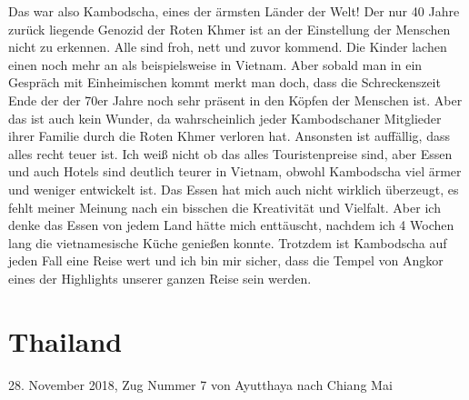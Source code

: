 \documentclass[11pt]{book}
\begin{document}
Das war also Kambodscha, eines der ärmsten Länder der Welt! Der nur 40 Jahre zurück liegende Genozid der Roten Khmer ist an der 
Einstellung der Menschen nicht zu erkennen. Alle sind froh, nett und zuvor kommend. Die Kinder lachen einen noch mehr an als 
beispielsweise in Vietnam. Aber sobald man in ein Gespräch mit Einheimischen kommt merkt man doch, dass die Schreckenszeit Ende der 
der 70er Jahre noch sehr präsent in den Köpfen der Menschen ist. Aber das ist auch kein Wunder, da wahrscheinlich jeder Kambodschaner 
Mitglieder ihrer Familie durch die Roten Khmer verloren hat. Ansonsten ist auffällig, dass alles recht teuer ist. Ich weiß nicht ob das 
alles Touristenpreise sind, aber Essen und auch Hotels sind deutlich teurer in Vietnam, obwohl Kambodscha viel ärmer und weniger 
entwickelt ist. Das Essen hat mich auch nicht wirklich überzeugt, es fehlt meiner Meinung nach ein bisschen die Kreativität und 
Vielfalt. Aber ich denke das Essen von jedem Land hätte mich enttäuscht, nachdem ich 4 Wochen lang die vietnamesische Küche genießen 
konnte. Trotzdem ist Kambodscha auf jeden Fall eine Reise wert und ich bin mir sicher, dass die Tempel von Angkor eines der Highlights 
unserer ganzen Reise sein werden.


\chapter{Thailand}

28. November 2018, Zug Nummer 7 von Ayutthaya nach Chiang Mai
\end{document}
